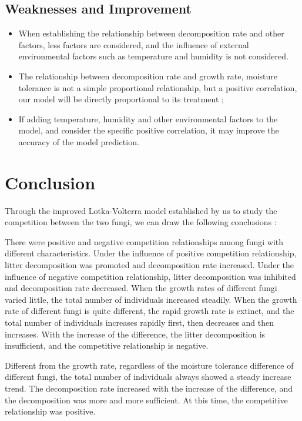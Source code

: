 \documentclass{mcmthesis}
\begin{document}
\subsection{Weaknesses and Improvement}
\begin{itemize}
\item When establishing the relationship between decomposition rate and other factors, less factors are considered, and the influence of external environmental factors such as temperature and humidity is not considered. 

\item The relationship between decomposition rate and growth rate, moisture tolerance is not a simple proportional relationship, but a positive correlation, our model will be directly proportional to its treatment ; 

\item If adding temperature, humidity and other environmental factors to the model, and consider the specific positive correlation, it may improve the accuracy of the model prediction.
\end{itemize}
\section{Conclusion}
Through the improved Lotka-Volterra model established by us to study the competition between the two fungi, we can draw the following conclusions : 

There were positive and negative competition relationships among fungi with different characteristics. Under the influence of positive competition relationship, litter decomposition was promoted and decomposition rate increased. Under the influence of negative competition relationship, litter decomposition was inhibited and decomposition rate decreased. When the growth rates of different fungi varied little, the total number of individuals increased steadily. When the growth rate of different fungi is quite different, the rapid growth rate is extinct, and the total number of individuals increases rapidly first, then decreases and then increases. With the increase of the difference, the litter decomposition is insufficient, and the competitive relationship is negative.

Different from the growth rate, regardless of the moisture tolerance difference of different fungi, the total number of individuals always showed a steady increase trend. The decomposition rate increased with the increase of the difference, and the decomposition was more and more sufficient. At this time, the competitive relationship was positive. 
\end{document}
